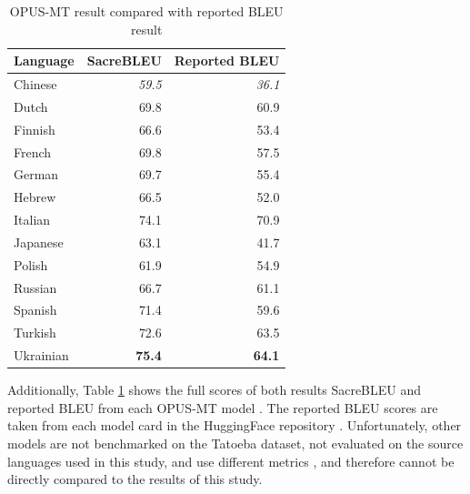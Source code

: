 \documentclass[a4paper, 11pt]{article}
\begin{document}
\begin{table}[htbp]
    \centering
    \begin{tabular}{l r r}
        \hline
        \textbf{Language} & \textbf{SacreBLEU} & \textbf{Reported BLEU} \\
        \hline
        Chinese           & \textit{59.5}      & \textit{36.1}          \\
        Dutch             & 69.8               & 60.9                   \\
        Finnish           & 66.6               & 53.4                   \\
        French            & 69.8               & 57.5                   \\
        German            & 69.7               & 55.4                   \\
        Hebrew            & 66.5               & 52.0                   \\
        Italian           & 74.1               & 70.9                   \\
        Japanese          & 63.1               & 41.7                   \\
        Polish            & 61.9               & 54.9                   \\
        Russian           & 66.7               & 61.1                   \\
        Spanish           & 71.4               & 59.6                   \\
        Turkish           & 72.6               & 63.5                   \\
        Ukrainian         & \textbf{75.4}      & \textbf{64.1}          \\
        \hline
    \end{tabular}
    \caption{OPUS-MT result compared with reported BLEU result}
    \label{table:opus_comparison}
\end{table}

Additionally, Table \ref{table:opus_comparison} shows the full scores of both results SacreBLEU and reported BLEU from each OPUS-MT model \cite{tiedemann-2020-opus-mt}. The reported BLEU scores are taken from each model card in the HuggingFace repository \cite{huggingface}. Unfortunately, other models are not benchmarked on the Tatoeba dataset, not evaluated on the source languages used in this study, and use different metrics \cite{liu-2020-mbart,fan-2020-m2m100,nllb200-2020}, and therefore cannot be directly compared to the results of this study.
\end{document}
